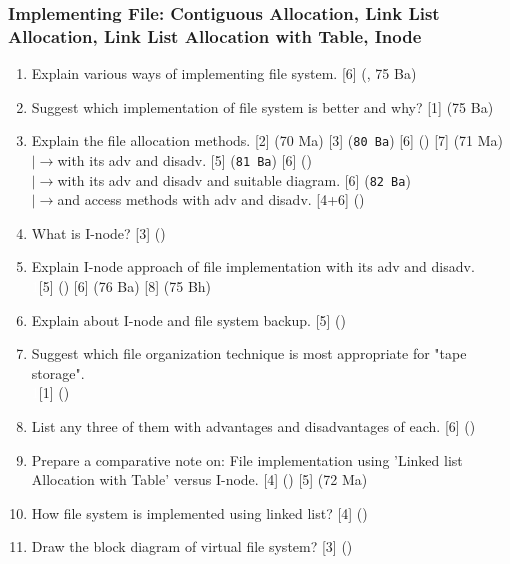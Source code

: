 \documentclass[12pt]{article}
\newcommand{\lb}{\\$\left|\rightarrow\right.$}
\newcommand{\enter}{\\\textcolor{white}{1}}
\begin{document}
		\subsubsection{Implementing File: Contiguous Allocation, Link List Allocation, Link List Allocation with Table, Inode}
			\begin{enumerate}[noitemsep, topsep=0pt]
				\item Explain various ways of implementing file system. \hfill [6] (, 75 Ba)

				\item Suggest which implementation of file system is better and why? \hfill [1] (75 Ba)

				\item Explain the file allocation methods. \hfill [2] (70 Ma) [3] (\texttt{80 Ba}) [6] () [7] (71 Ma)
				\lb with its adv and disadv. \hfill [5] (\texttt{81 Ba}) [6] ()
				\lb with its adv and disadv and suitable diagram. \hfill [6] (\texttt{82 Ba})
				\lb and access methods with adv and disadv. \hfill [4+6] ()

				\item What is I-node? \hfill [3] ()

				\item Explain I-node approach of file implementation with its adv and disadv.
				\enter\hfill [5] () [6] (76 Ba) [8] (75 Bh)

				\item Explain about I-node and file system backup. \hfill [5] ()

				\item Suggest which file organization technique is most appropriate for "tape storage".
				\enter\hfill [1] ()

				\item List any three of them with advantages and disadvantages of each. \hfill [6] ()

				\item Prepare a comparative note on: File implementation using 'Linked list Allocation with Table' versus I-node. \hfill [4] () [5] (72 Ma)

				\item How file system is implemented using linked list? \hfill [4] ()

				\item Draw the block diagram of virtual file system? \hfill [3] ()
			\end{enumerate}					
		
\end{document}

